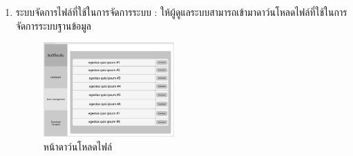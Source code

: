 \begin{enumerate}
  \item ระบบจัดการไฟล์ที่ใช้ในการจัดการระบบ : ให้ผู้ดูแลระบบสามารถเข้ามาดาว์นโหลดไฟล์ที่ใช้ในการจัดการระบบฐานข้อมูล
  \begin{figure}[h]
  \begin{center}
  \includegraphics[width=50mm,scale=0.5]{photo/format.png}
  \end{center}
  \caption{หน้าดาว์นโหลดไฟล์}
  \label{fig:format-db}
  \end{figure}
\end{enumerate}